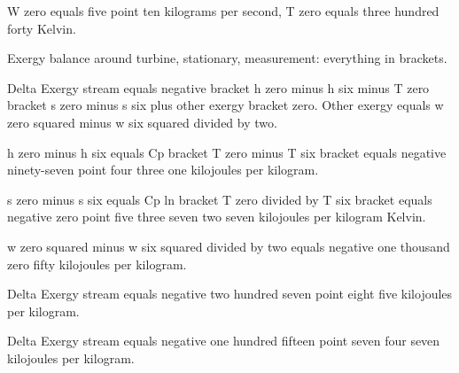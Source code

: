 W zero equals five point ten kilograms per second, T zero equals three hundred forty Kelvin.

Exergy balance around turbine, stationary, measurement: everything in brackets.

Delta Exergy stream equals negative bracket h zero minus h six minus T zero bracket s zero minus s six plus other exergy bracket zero. Other exergy equals w zero squared minus w six squared divided by two.

h zero minus h six equals Cp bracket T zero minus T six bracket equals negative ninety-seven point four three one kilojoules per kilogram.

s zero minus s six equals Cp ln bracket T zero divided by T six bracket equals negative zero point five three seven two seven kilojoules per kilogram Kelvin.

w zero squared minus w six squared divided by two equals negative one thousand zero fifty kilojoules per kilogram.

Delta Exergy stream equals negative two hundred seven point eight five kilojoules per kilogram.

Delta Exergy stream equals negative one hundred fifteen point seven four seven kilojoules per kilogram.